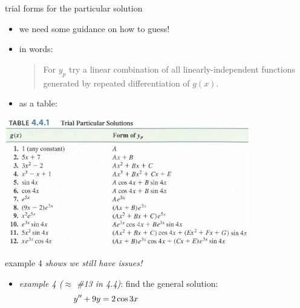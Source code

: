 \documentclass[dvipsnames]{beamer}
\begin{document}
\begin{frame}{trial forms for the particular solution}

\begin{itemize}
\item we need some guidance on how to guess!
\item in words:

\begin{quotation}
\noindent \alert{For $y_p$ try a linear combination of all linearly-independent functions generated by repeated differentiation of $g(x)$.}
\end{quotation}

\vspace{-3mm}
\item as a table:
\end{itemize}

\hfill \includegraphics[width=0.8\textwidth]{figs/yptable}
\end{frame}


\begin{frame}{example 4 \emph{shows we still have issues!}}

\begin{itemize}
\item \emph{example 4 ($\approx$ \#13 in 4.4)}: find the general solution:
    $$y'' + 9 y = 2 \cos 3x \hspace{50mm}$$
\end{itemize}

\vspace{60mm}
\end{frame}
\end{document}
